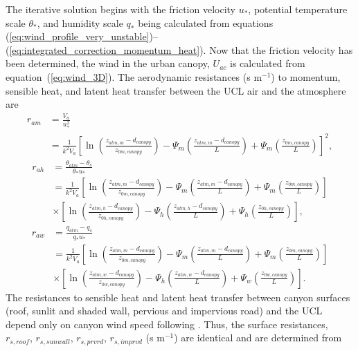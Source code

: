 \documentclass[12pt,authoryear]{elsarticle}
\numberwithin{equation}{section} %
\begin{document}
The iterative solution begins with the friction velocity $u_{*}$, potential temperature scale $\theta_{*}$, and humidity scale $q_{*}$ being calculated from equations (\ref{eq:wind_profile_very_unstable})--(\ref{eq:integrated_correction_momentum_heat}). Now that the
friction velocity has been determined, the wind in the urban canopy, $U_{ac}$ is calculated from equation~(\ref{eq:wind_3D}). The aerodynamic resistances (s m$^{-1}$) to momentum, sensible heat, and latent heat transfer between the UCL air and the atmosphere are
\begin{equation}
\begin{aligned}
r_{am} 
&= \frac{V_{a}}{u_{*}^2} \\
&= \frac{1}{k^2V_{a}}\left[\ln\left(\frac{z_{atm,m}-d_{canopy}}{z_{0m,canopy}}\right)-\Psi_{m}\left(\frac{z_{atm,m}-d_{canopy}}{L}\right)+\Psi_{m}\left(\frac{z_{0m,canopy}}{L}\right)\right]^2,
\end{aligned}
\end{equation}
\begin{equation}
\begin{aligned}
r_{ah} 
&= \frac{\theta_{atm}-\theta_{s}}{\theta_*u_*} \\
&= \frac{1}{k^2V_{a}}\left[\ln\left(\frac{z_{atm,m}-d_{canopy}}{z_{0m,canopy}}\right)-\Psi_{m}\left(\frac{z_{atm,m}-d_{canopy}}{L}\right)+\Psi_{m}\left(\frac{z_{0m,canopy}}{L}\right)\right]\\
&\times\left[\ln\left(\frac{z_{atm,h}-d_{canopy}}{z_{0h,canopy}}\right)-\Psi_{h}\left(\frac{z_{atm,h}-d_{canopy}}{L}\right)+\Psi_{h}\left(\frac{z_{0h,canopy}}{L}\right)\right],
\end{aligned}
\end{equation}
\begin{equation}
\begin{aligned}
r_{aw} 
&= \frac{q_{atm}-q_{s}}{q_*u_*} \\
&= \frac{1}{k^2V_{a}}\left[\ln\left(\frac{z_{atm,m}-d_{canopy}}{z_{0m,canopy}}\right)-\Psi_{m}\left(\frac{z_{atm,m}-d_{canopy}}{L}\right)+\Psi_{m}\left(\frac{z_{0m,canopy}}{L}\right)\right]\\
&\times\left[\ln\left(\frac{z_{atm,w}-d_{canopy}}{z_{0w,canopy}}\right)-\Psi_{h}\left(\frac{z_{atm,w}-d_{canopy}}{L}\right)+\Psi_{w}\left(\frac{z_{0w,canopy}}{L}\right)\right].
\end{aligned}
\end{equation}
The resistances to sensible heat and latent heat transfer between canyon surfaces (roof, sunlit and shaded wall, pervious and impervious road) and the UCL depend only on canyon wind speed following \cite{massonPhysicallyBasedSchemeUrban2000}. Thus, the surface resistances, $r_{s,roof}$, $r_{s,sunwall}$, $r_{s,prvrd}$, $r_{s,imprvd}$ (s m$^{-1}$) are identical and are determined from \citep{rowleySurfaceConductancesAffected1930}
\end{document}
